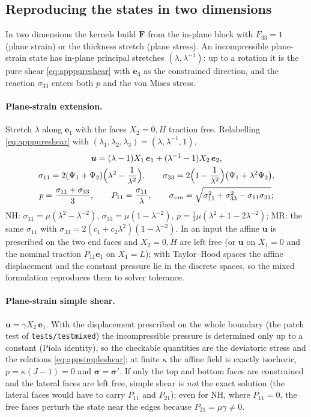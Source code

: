 \documentclass[11pt]{article}
\newcommand{\bu}{\bm{u}}
\newcommand{\be}{\bm{e}}
\newcommand{\bsig}{\bm{\sigma}}
\newcommand{\bF}{\bm{F}}
\newcommand{\Pone}{\Psi_{1}}
\newcommand{\Ptwo}{\Psi_{2}}
\DeclareRobustCommand{\file}[1]{{\def\_{\textunderscore\allowbreak}\texttt{#1}}}
\begin{document}
\subsection{Reproducing the states in two dimensions}
\label{app:twod}

In two dimensions the kernels build $\bF$ from the in-plane block with
$F_{33} = 1$ (plane strain) or the thickness stretch (plane stress).  An
incompressible plane-strain state has in-plane principal stretches
$(\lambda, \lambda^{-1})$: up to a rotation it is the pure shear
\eqref{eq:apppureshear} with $\be_3$ as the constrained direction, and the
reaction $\sigma_{33}$ enters both $p$ and the von Mises stress.

\paragraph{Plane-strain extension.}
Stretch $\lambda$ along $\be_1$ with the faces $X_2 = 0, H$ traction free.
Relabelling \eqref{eq:apppureshear} with
$(\lambda_1, \lambda_2, \lambda_3) = (\lambda, \lambda^{-1}, 1)$,
\begin{gather}
  \bu = (\lambda - 1)X_1\,\be_1 + (\lambda^{-1} - 1)X_2\,\be_2, \\
  \sigma_{11} = 2(\Pone + \Ptwo)\Bigl(\lambda^2 - \frac1{\lambda^2}\Bigr), \qquad
  \sigma_{33} = 2\Bigl(1 - \frac1{\lambda^2}\Bigr)\bigl(\Pone + \lambda^2\Ptwo\bigr), \\
  p = \frac{\sigma_{11} + \sigma_{33}}{3}, \qquad
  P_{11} = \frac{\sigma_{11}}{\lambda}, \qquad
  \sigma_{vm} = \sqrt{\sigma_{11}^2 + \sigma_{33}^2 - \sigma_{11}\sigma_{33}} ;
\end{gather}
NH: $\sigma_{11} = \mu(\lambda^2 - \lambda^{-2})$,
$\sigma_{33} = \mu(1 - \lambda^{-2})$,
$p = \tfrac13\mu(\lambda^2 + 1 - 2\lambda^{-2})$; MR: the same $\sigma_{11}$
with $\sigma_{33} = 2(c_1 + c_2\lambda^2)(1 - \lambda^{-2})$.  In an input
the affine $\bu$ is prescribed on the two end faces and $X_2 = 0, H$ are
left free (or $\bu$ on $X_1 = 0$ and the nominal traction $P_{11}\be_1$ on
$X_1 = L$); with Taylor--Hood spaces the affine displacement and the
constant pressure lie in the discrete spaces, so the mixed formulation
reproduces them to solver tolerance.

\paragraph{Plane-strain simple shear.}
$\bu = \gamma X_2\,\be_1$.  With the displacement prescribed on the whole
boundary (the patch test of \file{tests/test\_mixed}) the incompressible
pressure is determined only up to a constant (Piola identity), so the
checkable quantities are the deviatoric stress and the relations
\eqref{eq:appsimpleshear}; at finite $\kappa$ the affine field is exactly
isochoric, $p = \kappa(J - 1) = 0$ and $\bsig = \bsig'$.  If only the top
and bottom faces are constrained and the lateral faces are left free,
simple shear is \emph{not} the exact solution (the lateral faces would have
to carry $P_{11}$ and $P_{21}$); even for NH, where $P_{11} = 0$, the free
faces perturb the state near the edges because $P_{21} = \mu\gamma \ne 0$.
\end{document}
